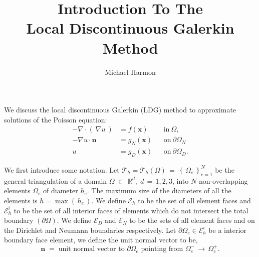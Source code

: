 \documentclass[12pt,letterpaper]{article}
\title{Introduction To The \\Local Discontinuous Galerkin Method}
\author{Michael Harmon}
\begin{document}
\maketitle

We discuss the local discontinuous Galerkin (LDG) method to approximate solutions of the Poisson equation:
\begin{equation}
\begin{aligned}
- \nabla \cdot  \left(\ \nabla u \ \right)&= f(\textbf{x}) && \mbox{in} \ \Omega, \\
-\nabla u \cdot \textbf{n}  &= g_{N}(\textbf{x}) && \mbox{on} \ \partial \Omega_{N} \\
u &= g_{D}(\textbf{x}) && \mbox{on}  \ \partial \Omega_{D}.
\end{aligned}
\end{equation}


We first introduce some notation. Let $\mathcal{T}_{h} = \mathcal{T}_{h}(\Omega) \, = \, \left\{ \, \Omega_{e} \, \right\}_{e=1}^{N}$ be  the general triangulation of a domain $\Omega \; \subset \; \mathbb{R}^{d}, \; d \, = \, 1, 2, 3$, into $N$ non-overlapping elements $\Omega_{e}$ of diameter $h_{e}$.  The maximum size of the diameters of all the elements is $h = \max( \, h_{e}\, )$.  We define $\mathcal{E}_{h}$ to be the set of all element faces and $\mathcal{E}_{h}^{i} $ to be the set of all interior faces of elements which do not intersect the total boundary $(\partial \Omega)$. We define $\mathcal{E}_{D}$ and $\mathcal{E}_{N}$ to be the sets of all element faces and on the Dirichlet and Neumann boundaries respectively. Let $\partial \Omega_{e} \in \mathcal{E}_{h}^{i}$ be a interior boundary face element, we define the unit normal vector to be,
\begin{equation}
\textbf{n} \; = \; \text{unit normal vector to } \partial \Omega_{e}  \text{ pointing from } \Omega_{e}^{-} \, \rightarrow  \, \Omega_{e}^{+}.
\end{equation}
\end{document}

